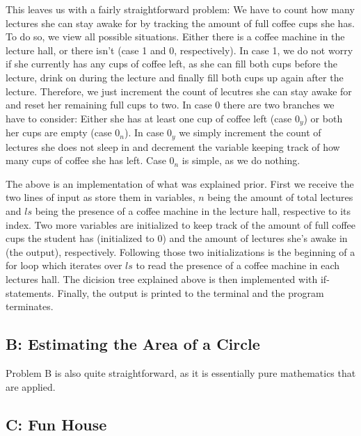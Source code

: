 \documentclass{article}
\begin{document}
This leaves us with a fairly straightforward problem: We have to count how many lectures she can stay awake for by tracking the amount of full coffee cups she has. To do so, we view all possible situations. Either there is a coffee machine in the lecture hall, or there isn't (case 1 and 0, respectively). In case 1, we do not worry if she currently has any cups of coffee left, as she can fill both cups before the lecture, drink on during the lecture and finally fill both cups up again after the lecture. Therefore, we just increment the count of lecutres she can stay awake for and reset her remaining full cups to two. In case 0 there are two branches we have to consider: Either she has at least one cup of coffee left (case $0_y$) or both her cups are empty (case $0_n$). In case $0_y$ we simply increment the count of lectures she does not sleep in and decrement the variable keeping track of how many cups of coffee she has left. Case $0_n$ is simple, as we do nothing.



The above is an implementation of what was explained prior. First we receive the two lines of input as store them in variables, $n$ being the amount of total lectures and $ls$ being the presence of a coffee machine in the lecture hall, respective to its index. Two more variables are initialized to keep track of the amount of full coffee cups the student has (initialized to 0) and the amount of lectures she's awake in (the output), respectively. Following those two initializations is the beginning of a for loop which iterates over $ls$ to read the presence of a coffee machine in each lectures hall. The dicision tree explained above is then implemented with if-statements. Finally, the output is printed to the terminal and the program terminates.

\subsection{B: Estimating the Area of a Circle}

Problem B is also quite straightforward, as it is essentially pure mathematics that are applied.



\subsection{C: Fun House}
\end{document}
